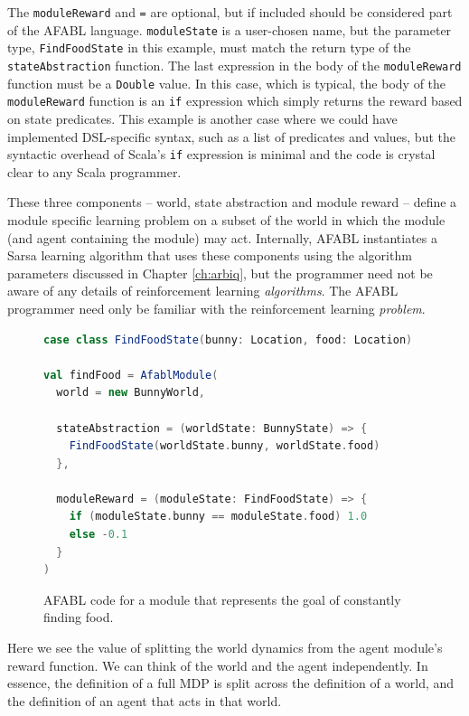 The {\tt moduleReward} and {\tt =} are optional, but if included should be considered part of the AFABL language. {\tt moduleState} is a user-chosen name, but the parameter type, {\tt FindFoodState} in this example, must match the return type of the {\tt stateAbstraction} function. The last expression in the body of the {\tt moduleReward} function must be a {\tt Double} value. In this case, which is typical, the body of the {\tt moduleReward} function is an {\tt if} expression which simply returns the reward based on state predicates. This example is another case where we could have implemented DSL-specific syntax, such as a list of predicates and values, but the syntactic overhead of Scala's {\tt if} expression is minimal and the code is crystal clear to any Scala programmer.

These three components -- world, state abstraction and module reward -- define a module specific learning problem on a subset of the world in which the module (and agent containing the module) may act. Internally, AFABL instantiates a Sarsa learning algorithm that uses these components using the algorithm parameters discussed in Chapter \ref{ch:arbiq}, but the programmer need not be aware of any details of reinforcement learning {\it algorithms}. The AFABL programmer need only be familiar with the reinforcement learning {\it problem}.

\begin{figure}[h]
\begin{center}

\begin{lstlisting}[language=Scala]
case class FindFoodState(bunny: Location, food: Location)

val findFood = AfablModule(
  world = new BunnyWorld,

  stateAbstraction = (worldState: BunnyState) => {
    FindFoodState(worldState.bunny, worldState.food)
  },

  moduleReward = (moduleState: FindFoodState) => {
    if (moduleState.bunny == moduleState.food) 1.0
    else -0.1
  }
)
\end{lstlisting}

\caption{AFABL code for a module that represents the goal of constantly finding food.}
\end{center}
\label{fig:find-food-code}
\end{figure}

Here we see the value of splitting the world dynamics from the agent module's reward function. We can think of the world and the agent independently. In essence, the definition of a full MDP is split across the definition of a world, and the definition of an agent that acts in that world.

